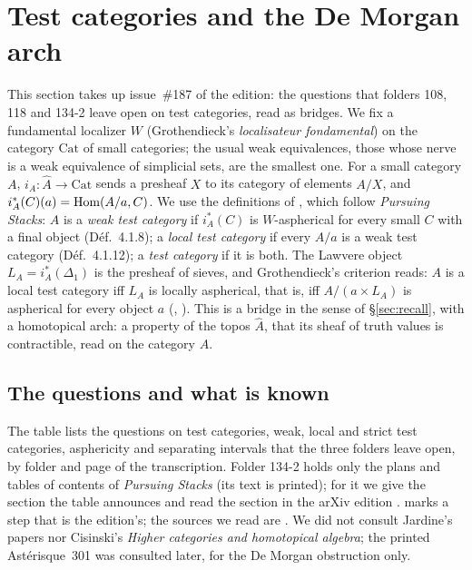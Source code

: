 \section{Test categories and the De Morgan arch}\label{sec:test}

This section takes up issue~\#187 of the edition: the questions that folders 108, 118 and 134-2 leave open on test categories, read as bridges. We fix a fundamental localizer $W$ (Grothendieck's \emph{localisateur fondamental}) on the category $\mathrm{Cat}$ of small categories; the usual weak equivalences, those whose nerve is a weak equivalence of simplicial sets, are the smallest one. For a small category $A$, $i_A\colon\widehat A\to\mathrm{Cat}$ sends a presheaf $X$ to its category of elements $A/X$, and $i_A^*(C)(a) = \operatorname{Hom}(A/a, C)$. We use the definitions of \cite[\S4.1]{cisinski-308}, which follow \emph{Pursuing Stacks}: $A$ is a \emph{weak test category} if $i_A^*(C)$ is $W$-aspherical for every small $C$ with a final object (Déf.~4.1.8); a \emph{local test category} if every $A/a$ is a weak test category (Déf.~4.1.12); a \emph{test category} if it is both. The Lawvere object $L_A = i_A^*(\Delta_1)$ is the presheaf of sieves, and Grothendieck's criterion reads: $A$ is a local test category iff $L_A$ is locally aspherical, that is, iff $A/(a\times L_A)$ is aspherical for every object $a$ (\cite[Th.~4.1.19]{cisinski-308}, \cite[Th.~6.6]{maltsiniotis-2001}). This is a bridge in the sense of \S\ref{sec:recall}, with a homotopical arch: a property of the topos $\widehat A$, that its sheaf of truth values is contractible, read on the category $A$.

\subsection{The questions and what is known}

The table lists the questions on test categories, weak, local and strict test categories, asphericity and separating intervals that the three folders leave open, by folder and page of the transcription. Folder 134-2 holds only the plans and tables of contents of \emph{Pursuing Stacks} (its text is printed); for it we give the section the table announces and read the section in the arXiv edition \cite{ps-arxiv}.  marks a step that is the edition's; the sources we read are \cite{cisinski-308,maltsiniotis-2001,ps-arxiv,hubert-thesis,hubert-dk}. We did not consult Jardine's papers nor Cisinski's \emph{Higher categories and homotopical algebra}; the printed Astérisque~301 \cite{maltsiniotis-301} was consulted later, for the De Morgan obstruction only.

